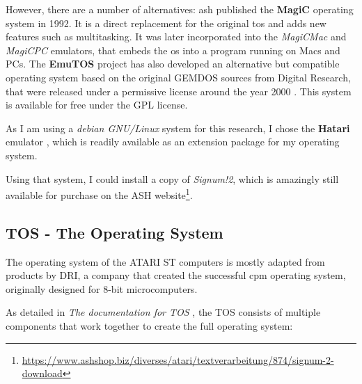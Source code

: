 However, there are a number of alternatives:
\acrlong{ash} published the \textbf{MagiC} operating system in 1992. It is a direct replacement for the original \acrshort{tos} and adds new features such as multitasking. It was later incorporated into the \textit{MagiCMac} and \textit{MagiCPC} emulators, that embeds the \acrshort{os} into a program running on Macs and PCs.
The \textbf{EmuTOS} project has also developed an alternative but compatible operating system based on the original GEMDOS sources from Digital Research, that were released under a permissive license around the year 2000 \cite{emuTOSHistory}. This system is available for free under the GPL license.

As I am using a \textit{debian GNU/Linux} system for this research, I chose the \textbf{Hatari} emulator \cite{hatari}, which is readily available as an extension package for my operating system.

Using that system, I could install a copy of \textit{Signum!2}, which is amazingly still available for purchase on the ASH website\footnote{\url{https://www.ashshop.biz/diverses/atari/textverarbeitung/874/signum-2-download}}.

\subsection{TOS - The Operating System}

The operating system of the ATARI ST computers is mostly adapted from products by \gls{DRI}, a company that created the successful \acrshort{cpm} operating system, originally designed for 8-bit microcomputers.

As detailed in \textit{The documentation for TOS} \cite{tos.hyp}, the TOS consists of multiple components that work together to create the full operating system:

